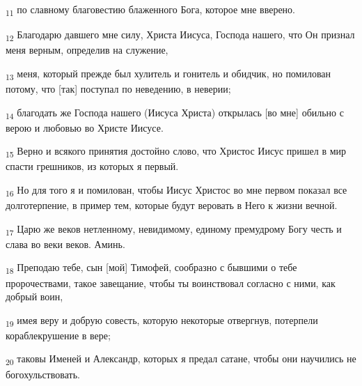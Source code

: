 \begin{tcolorbox}
\textsubscript{11} по славному благовестию блаженного Бога, которое мне вверено.
\end{tcolorbox}
\begin{tcolorbox}
\textsubscript{12} Благодарю давшего мне силу, Христа Иисуса, Господа нашего, что Он признал меня верным, определив на служение,
\end{tcolorbox}
\begin{tcolorbox}
\textsubscript{13} меня, который прежде был хулитель и гонитель и обидчик, но помилован потому, что [так] поступал по неведению, в неверии;
\end{tcolorbox}
\begin{tcolorbox}
\textsubscript{14} благодать же Господа нашего (Иисуса Христа) открылась [во мне] обильно с верою и любовью во Христе Иисусе.
\end{tcolorbox}
\begin{tcolorbox}
\textsubscript{15} Верно и всякого принятия достойно слово, что Христос Иисус пришел в мир спасти грешников, из которых я первый.
\end{tcolorbox}
\begin{tcolorbox}
\textsubscript{16} Но для того я и помилован, чтобы Иисус Христос во мне первом показал все долготерпение, в пример тем, которые будут веровать в Него к жизни вечной.
\end{tcolorbox}
\begin{tcolorbox}
\textsubscript{17} Царю же веков нетленному, невидимому, единому премудрому Богу честь и слава во веки веков. Аминь.
\end{tcolorbox}
\begin{tcolorbox}
\textsubscript{18} Преподаю тебе, сын [мой] Тимофей, сообразно с бывшими о тебе пророчествами, такое завещание, чтобы ты воинствовал согласно с ними, как добрый воин,
\end{tcolorbox}
\begin{tcolorbox}
\textsubscript{19} имея веру и добрую совесть, которую некоторые отвергнув, потерпели кораблекрушение в вере;
\end{tcolorbox}
\begin{tcolorbox}
\textsubscript{20} таковы Именей и Александр, которых я предал сатане, чтобы они научились не богохульствовать.
\end{tcolorbox}
